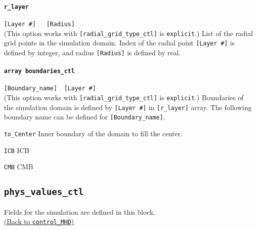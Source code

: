 \paragraph{\tt r\_layer}
\label{href_t:r_layer}
\verb|[Layer #]   [Radius]| \\
(This option works with \verb|[radial_grid_type_ctl]| is {\tt explicit}.)
List of the radial grid points in the simulation domain. Index of the radial point \verb|[Layer #]| is defined by integer, and radius \verb|[Radius]| is defined by real.

\paragraph{\tt array boundaries\_ctl}
\verb|[Boundary_name]  [Layer #]| \\
\label{href_t:boundaries_ctl} 
(This option works with \verb|[radial_grid_type_ctl]| is {\tt explicit}.)
Boundaries of the simulation domain is defined by \verb|[Layer #]| in \verb|[r_layer]| array. The following boundary name can be defined for \verb|[Boundary_name]|.
%
\begin{description}
	\item{\tt to\_Center} Inner boundary of the domain to fill the center.
	\item{\tt ICB} ICB
	\item{\tt CMB} CMB
\end{description}
%
%
%

\subsection{\tt phys\_values\_ctl}
\label{href_t:phys_values_ctl}
Fields for the simulation are defined in this block. \\
\hyperref[href_i:phys_values_ctl]{(Back to {\tt control\_MHD})}
%
